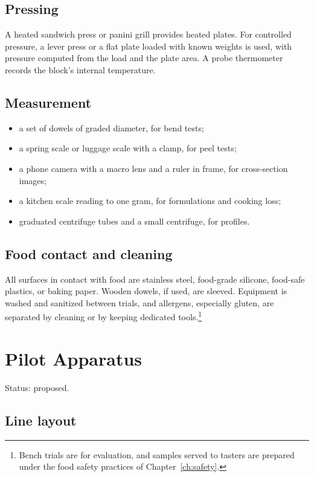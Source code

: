 \documentclass[11pt,openany]{book}
\theoremstyle{definition}
\begin{document}
\section{Pressing}

A heated sandwich press or panini grill provides heated plates. For controlled pressure, a lever press or a flat plate loaded with known weights is used, with pressure computed from the load and the plate area. A probe thermometer records the block's internal temperature.

\section{Measurement}

\begin{itemize}
\item a set of dowels of graded diameter, for bend tests;
\item a spring scale or luggage scale with a clamp, for peel tests;
\item a phone camera with a macro lens and a ruler in frame, for cross-section images;
\item a kitchen scale reading to one gram, for formulations and cooking loss;
\item graduated centrifuge tubes and a small centrifuge, for profiles.
\end{itemize}

\section{Food contact and cleaning}

All surfaces in contact with food are stainless steel, food-grade silicone, food-safe plastics, or baking paper. Wooden dowels, if used, are sleeved. Equipment is washed and sanitized between trials, and allergens, especially gluten, are separated by cleaning or by keeping dedicated tools.\footnote{Bench trials are for evaluation, and samples served to tasters are prepared under the food safety practices of Chapter~\ref{ch:safety}.}

\chapter{Pilot Apparatus}\label{ch:pilot}

Status: proposed.

\section{Line layout}
\end{document}
